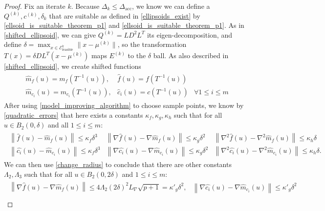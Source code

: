 \documentclass{article}
\theoremstyle{case}
\newcommand{\lipgrad}{{L_{\nabla}}}
\newcommand{\dacc}{{\Delta_{\text{acc}}}}
\newcommand{\dk}{\Delta_k}
\newcommand{\qk}{{Q^{(k)}}}
\newcommand{\ck}{{c^{(k)}}}
\newcommand{\sdk}{{\delta_k}}
\newcommand{\unshiftedellipsoid}{{\mathcal E^k_{\text{feasible}}}}
\begin{document}
\begin{proof}
Fix an iterate $k$.
Because $\dk \le \dacc$, we know we can define a $\qk, \ck, \sdk$ that are suitable as defined in \cref{ellipsoids_exist}
by \cref{ellsoid_is_suitable_theorem_p1} and \cref{ellsoid_is_suitable_theorem_p1}.
As in \cref{shifted_ellipsoid}, we can give $\qk = LD^2L^T$ its eigen-decomposition, and define $\delta = \max_{x \in \unshiftedellipsoid} \|x - \mu^{(k)}\|$, 
so the transformation $T(x) = \delta D L^T(x - \mu^{(k)})$ maps $E^{(k)}$ to the $\delta$ ball.
As also described in \cref{shifted_ellipsoid}, we  create shifted functions
\begin{align*}
\begin{array}{ccc}
\hat {m}_f(u) = m_f(T^{-1}(u)),&  \hat f (u) = f(T^{-1}(u)) &\\
\hat {m}_{c_i}(u) = m_{c_i}(T^{-1}(u)), &  \hat c_i (u) = c(T^{-1}(u))& \forall 1 \le i \le m
\end{array}
\end{align*}
After using \cref{model_improving_algorithm} to choose sample points, we know by \cref{quadratic_errors} that
here exists a constants $\kappa_f, \kappa_g, \kappa_h$ such that for all $u \in B_2(0, \delta)$ and all $1\le i\le m$:
\begin{align*}
\begin{array}{ccc}
\left\| \hat {f}\left(u\right) -  \hat{m}_f\left(u\right) \right\|\le \kappa_f \delta^3 &
\left\|\nabla \hat {f}\left(u\right) - \nabla \hat{m}_f\left(u\right) \right\|\le \kappa_g \delta^2 &
\left\|\nabla^2 \hat {f}\left(u\right) - \nabla^2 \hat{m}_f\left(u\right) \right\|\le \kappa_h \delta \\
\left\| \hat {{c_i}}\left(u\right) -  \hat{m}_{c_i}\left(u\right) \right\|\le \kappa_f \delta^3 &
\left\|\nabla \hat {{c_i}}\left(u\right) - \nabla \hat{m}_{c_i}\left(u\right) \right\|\le \kappa_g \delta^2 &
\left\|\nabla^2 \hat {{c_i}}\left(u\right) - \nabla^2 \hat{m}_{c_i}\left(u\right) \right\|\le \kappa_h \delta.
\end{array}
\end{align*}
We can then use \cref{change_radius} to conclude that there are other constants $\Lambda_2, \Lambda_3$ such that for all $u \in B_2(0, 2\delta)$ and $1\le i\le m$:
\begin{align*}
\begin{array}{cc}
\left\|\nabla \hat {f}\left(u\right) - \nabla \hat{m}_f\left(u\right) \right\|\le 4 \Lambda_2 \left(2\delta\right)^2 \lipgrad \sqrt{p+1} = {\kappa'}_g\delta^2, &
\left\|\nabla \hat {c_i}\left(u\right) - \nabla \hat{m}_{c_i}\left(u\right) \right\|\le {\kappa'}_g\delta^2 \\

\end{array}
\end{align*}
\end{proof}
\end{document}
